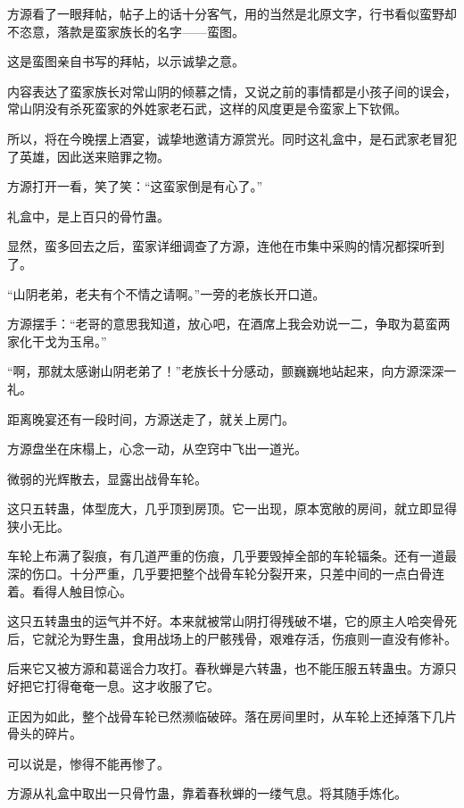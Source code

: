
\begin{this_body}



方源看了一眼拜帖，帖子上的话十分客气，用的当然是北原文字，行书看似蛮野却不恣意，落款是蛮家族长的名字——蛮图。

这是蛮图亲自书写的拜帖，以示诚挚之意。

内容表达了蛮家族长对常山阴的倾慕之情，又说之前的事情都是小孩子间的误会，常山阴没有杀死蛮家的外姓家老石武，这样的风度更是令蛮家上下钦佩。

所以，将在今晚摆上酒宴，诚挚地邀请方源赏光。同时这礼盒中，是石武家老冒犯了英雄，因此送来赔罪之物。

方源打开一看，笑了笑：“这蛮家倒是有心了。”

礼盒中，是上百只的骨竹蛊。

显然，蛮多回去之后，蛮家详细调查了方源，连他在市集中采购的情况都探听到了。

“山阴老弟，老夫有个不情之请啊。”一旁的老族长开口道。

方源摆手：“老哥的意思我知道，放心吧，在酒席上我会劝说一二，争取为葛蛮两家化干戈为玉帛。”

“啊，那就太感谢山阴老弟了！”老族长十分感动，颤巍巍地站起来，向方源深深一礼。

距离晚宴还有一段时间，方源送走了，就关上房门。

方源盘坐在床榻上，心念一动，从空窍中飞出一道光。

微弱的光辉散去，显露出战骨车轮。

这只五转蛊，体型庞大，几乎顶到房顶。它一出现，原本宽敞的房间，就立即显得狭小无比。

车轮上布满了裂痕，有几道严重的伤痕，几乎要毁掉全部的车轮辐条。还有一道最深的伤口。十分严重，几乎要把整个战骨车轮分裂开来，只差中间的一点白骨连着。看得人触目惊心。

这只五转蛊虫的运气并不好。本来就被常山阴打得残破不堪，它的原主人哈突骨死后，它就沦为野生蛊，食用战场上的尸骸残骨，艰难存活，伤痕则一直没有修补。

后来它又被方源和葛谣合力攻打。春秋蝉是六转蛊，也不能压服五转蛊虫。方源只好把它打得奄奄一息。这才收服了它。

正因为如此，整个战骨车轮已然濒临破碎。落在房间里时，从车轮上还掉落下几片骨头的碎片。

可以说是，惨得不能再惨了。

方源从礼盒中取出一只骨竹蛊，靠着春秋蝉的一缕气息。将其随手炼化。


\end{this_body}
